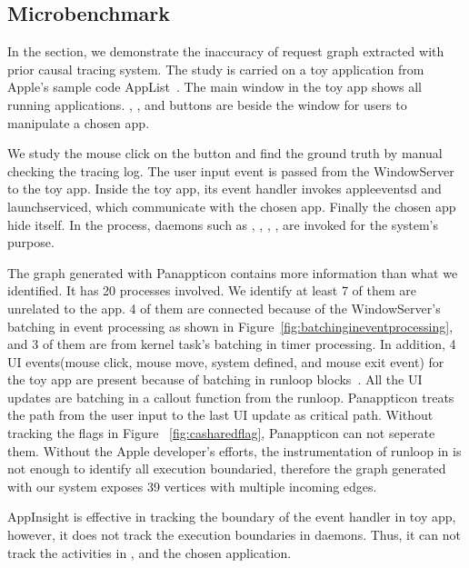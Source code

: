 \subsection{Microbenchmark} \label{sec:toystudy}

In the section, we demonstrate the inaccuracy of request graph extracted with
prior causal tracing system. The study is carried on a toy application from
Apple's sample code AppList~\cite{applist}. The main window in the toy app shows all running
applications. , , and  buttons are beside the
window for users to manipulate a chosen app. 


We study the mouse click on the  button and find the ground truth by
manual checking the tracing log.  The user input event is passed from the
WindowServer to the toy app. Inside the toy app, its event handler invokes
appleeventsd and launchserviced, which communicate with the chosen app. Finally
the chosen app hide itself. In the process, daemons such as ,
, , ,  are invoked for
the system's purpose.

The graph generated with Panappticon contains more information than what we
identified.  It has 20 processes involved. We identify at least 7 of them are
unrelated to the app. 4 of them are connected because of the WindowServer's
batching in event processing as shown in
Figure~\ref{fig:batchingineventprocessing}, and 3 of them are from kernel
task's batching in timer processing. In addition, 4 UI events(mouse click,
mouse move, system defined, and mouse exit event) for the toy app are present
because of batching in runloop blocks~\cite{runloop}. All the UI updates are
batching in a callout function from the runloop. Panappticon treats the path
from the user input to the last UI update as critical path.  Without tracking
the flags in Figure ~\ref{fig:casharedflag}, Panappticon can not seperate them.
Without the Apple developer's efforts, the instrumentation of runloop in \xxx
is not enough to identify all execution boundaried, therefore the graph
generated with our system exposes 39 vertices with multiple incoming edges.

AppInsight is effective in tracking the boundary of the event handler in toy
app, however, it does not track the execution boundaries in daemons. Thus, it 
can not track the activities in ,  and the chosen
application.
